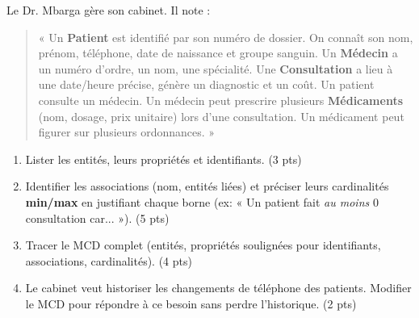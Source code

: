 \documentclass[11pt]{article}
\begin{document}
\begin{exercice}
Le Dr. Mbarga gère son cabinet. Il note :
\begin{quote}
« Un \textbf{Patient} est identifié par son numéro de dossier. On connaît son nom, prénom, téléphone, date de naissance et groupe sanguin. Un \textbf{Médecin} a un numéro d'ordre, un nom, une spécialité. Une \textbf{Consultation} a lieu à une date/heure précise, génère un diagnostic et un coût. Un patient consulte un médecin. Un médecin peut prescrire plusieurs \textbf{Médicaments} (nom, dosage, prix unitaire) lors d'une consultation. Un médicament peut figurer sur plusieurs ordonnances. »
\end{quote}
\begin{enumerate}
    \item Lister les entités, leurs propriétés et identifiants. (3 pts)
    \item Identifier les associations (nom, entités liées) et préciser leurs cardinalités \textbf{min/max} en justifiant chaque borne (ex: « Un patient fait \textit{au moins} 0 consultation car... »). (5 pts)
    \item Tracer le MCD complet (entités, propriétés soulignées pour identifiants, associations, cardinalités). (4 pts)
    \item Le cabinet veut historiser les changements de téléphone des patients. Modifier le MCD pour répondre à ce besoin sans perdre l'historique. (2 pts)
\end{enumerate}
\end{exercice}
\end{document}
